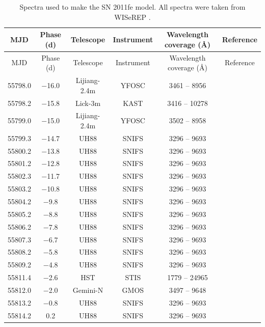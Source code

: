 \documentclass[a4paper,oneside,12pt, class=Latex/Classes/PhDthesisPSnPDF, crop=false]{standalone}
\begin{document}
\tiny
\begin{longtable}{cccccc}
 \caption{Spectra used to make the SN 2011fe model. All spectra were taken from WISeREP \citep{wiserep}.}
 \label{11fe_sources}
 \endfirsthead
 \hline
 \hline
 MJD  & Phase (d) & Telescope & Instrument & Wavelength coverage (\AA) & Reference    \\
 \hline
 \endhead
 \hline
 \endfoot
 \hline
 \endlastfoot
 \hline
 \hline
 MJD  & Phase (d) & Telescope & Instrument & Wavelength coverage (\AA) & Reference    \\
 \hline
 55798.0 & $-$16.0 & Lijiang-2.4m & YFOSC & 3461 -- 8956 & \citet{spec_Lijiang-2.4m} \\
 55798.2 & $-$15.8 & Lick-3m  & KAST & 3416 -- 10278 & \citet{Nugent_1st_Lick_spec} \\
 55799.0 & $-$15.0 & Lijiang-2.4m & YFOSC & 3502 -- 8958 & \citet{spec_Lijiang-2.4m} \\
 55799.3 & $-$14.7 & UH88   & SNIFS & 3296 -- 9693 & \citet{spec_UH88} \\
 55800.2 & $-$13.8 & UH88   & SNIFS & 3296 -- 9693 & \citet{spec_UH88} \\
 55801.2 & $-$12.8 & UH88   & SNIFS & 3296 -- 9693 & \citet{spec_UH88} \\
 55802.3 & $-$11.7 & UH88   & SNIFS & 3296 -- 9693 & \citet{spec_UH88} \\
 55803.2 & $-$10.8 & UH88   & SNIFS & 3296 -- 9693 & \citet{spec_UH88} \\
 55804.2 & $-$9.8 & UH88   & SNIFS & 3296 -- 9693 & \citet{spec_UH88} \\
 55805.2 & $-$8.8 & UH88   & SNIFS & 3296 -- 9693 & \citet{spec_UH88} \\
 55806.2 & $-$7.8 & UH88   & SNIFS & 3296 -- 9693 & \citet{spec_UH88} \\
 55807.3 & $-$6.7 & UH88   & SNIFS & 3296 -- 9693 & \citet{spec_UH88} \\
 55808.2 & $-$5.8 & UH88   & SNIFS & 3296 -- 9693 & \citet{spec_UH88} \\
 55809.2 & $-$4.8 & UH88   & SNIFS & 3296 -- 9693 & \citet{spec_UH88} \\
 55811.4 & $-$2.6 & HST   & STIS & 1779 -- 24965 & \citet{spec_HST} \\
 55812.0 & $-$2.0 & Gemini-N  & GMOS & 3497 -- 9648 & \citet{spec_Gemini-N} \\
 55813.2 & $-$0.8 & UH88   & SNIFS & 3296 -- 9693 & \citet{spec_UH88} \\
 55814.2 & 0.2 & UH88   & SNIFS & 3296 -- 9693 & \citet{spec_UH88} \\

\end{longtable}
\end{document}
